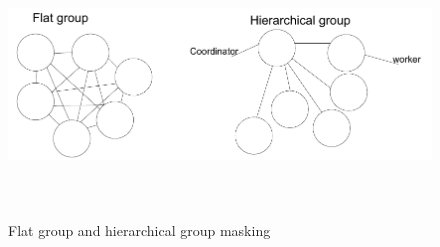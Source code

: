 \begin{figure}[H]
\large
\includegraphics[width=16cm, height=7cm]{fault_masking.pdf}
\vspace{-0.5cm}\caption{Flat group and hierarchical group masking}
\label{fig:4}
\end{figure}

\ifpdf
\fi


